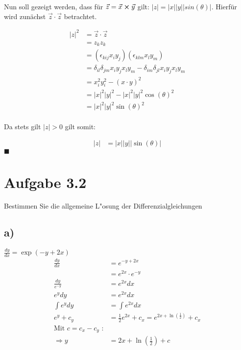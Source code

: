 \documentclass{theozettel}
\begin{document}
Nun soll gezeigt werden, dass für $\vec{z} = \vec{x} \cross \vec{y}$ gilt: $|z| = |x||y||sin(\theta)|$. Hierfür wird zunächst $\vec{z} \cdot \vec{z}$ betrachtet.

\begin{align*}
|z|^{2} &=  \vec{z} \cdot \vec{z} \\
&= z_k z_k \\
&= (\epsilon_{kij} x_i y_j) (\epsilon_{klm} x_l y_m) \\
&= \delta_{il} \delta_{jm} x_i y_j x_l y_m - \delta_{im} \delta_{jl} x_i y_j x_l y_m \\
&= x_i^{2} y_i^{2} - (x \cdot y)^{2} \\
&= |x|^{2} |y|^{2} -  |x|^{2} |y|^{2} \cos(\theta)^{2} \\
&= |x|^{2} |y|^{2} \sin(\theta)^{2} \\
\end{align*}

Da stets gilt $|z| > 0$ gilt somit:

\begin{align*}
|z| &= |x| |y| |\sin(\theta)| 
\end{align*} \hfill $\blacksquare$

\newpage
\section*{Aufgabe 3.2} Bestimmen Sie die allgemeine L"osung der Differenzialgleichungen\\
\subsection*{a)} $\frac{dy}{dx} = \exp\left(-y+2x\right)$\\
\begin{align*}
					\frac{dy}{dx} 	&= e^{-y+2x}\\
									&= e^{2x}\cdot e^{-y}\\
\frac{dy}{e^{-y}}	&= e^{2x} dx\\
e^y dy  &= e^{2x} dx\\
\int{e^y dy} &= \int{e^{2x} dx}\\
e^y +c_y &= \frac{1}{2} e^{2x} + c_x = e^{2x+ \ln\left(\frac{1}{2}\right)}+c_x\\
\text{Mit }c=c_x-c_y \text{ :}\\
\Rightarrow y&= 2x+ \ln{\left(\frac{1}{2}\right)}+c
\end{align*}
\end{document}
